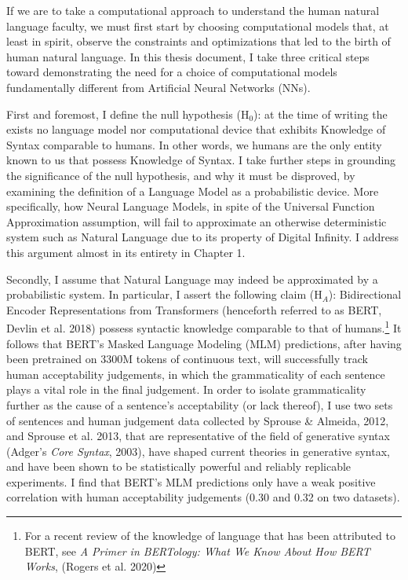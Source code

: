 % 
% 
%
If we are to take a computational approach to understand the human natural language faculty, we must first start by choosing computational models that, at least in spirit, observe the constraints and optimizations that led to the birth of human natural language.  In this thesis document, I take three critical steps toward demonstrating the need for a choice of computational models fundamentally different from Artificial Neural Networks (NNs).  

First and foremost, I define the null hypothesis ($\mathrm{H}_0$): at the time of writing the exists no language model nor computational device that exhibits Knowledge of Syntax comparable to humans.  In other words, we humans are the only entity known to us that possess Knowledge of Syntax.  I take further steps in grounding the significance of the null hypothesis, and why it must be disproved, by examining the definition of a Language Model as a probabilistic device.  More specifically, how Neural Language Models, in spite of the Universal Function Approximation assumption, will fail to approximate an otherwise deterministic system such as Natural Language due to its property of Digital Infinity.  I address this argument almost in its entirety in Chapter 1.  

Secondly, I assume that Natural Language may indeed be approximated by a probabilistic system.  In particular, I assert the following claim ($\mathrm{H}_{A}$): Bidirectional Encoder Representations from Transformers (henceforth referred to as BERT, Devlin et al. 2018) possess syntactic knowledge comparable to that of humans.\footnote{For a recent review of the knowledge of language that has been attributed to BERT, see \textit{A Primer in BERTology: What We Know About How BERT Works}, (Rogers et al. 2020)} It follows that BERT's Masked Language Modeling (MLM) predictions, after having been pretrained on 3300M tokens of continuous text, will successfully track human acceptability judgements, in which the grammaticality of each sentence plays a vital role in the final judgement.  In order to isolate grammaticality further as the cause of a sentence's acceptability (or lack thereof), I use two sets of sentences and human judgement data collected by Sprouse & Almeida, 2012, and Sprouse et al. 2013, that are representative of the field of generative syntax (Adger's \textit{Core Syntax}, 2003), have shaped current theories in generative syntax, and have been shown to be statistically powerful and reliably replicable experiments.  I find that BERT's MLM predictions only have a weak positive correlation with human acceptability judgements (0.30 and 0.32 on two datasets).

